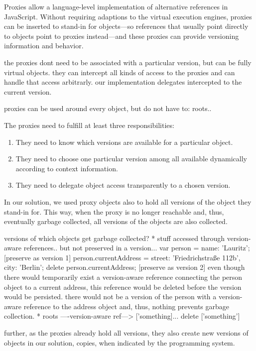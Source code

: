 Proxies allow a language-level implementation of alternative references in JavaScript.
Without requiring adaptions to the virtual execution engines, proxies can be inserted to stand-in for objects---so references that usually point directly to objects point to proxies instead---and these proxies can provide versioning information and behavior.

the proxies dont need to be associated with a particular version, but can be fully virtual objects.
they can intercept all kinds of access to the proxies and can handle that access arbitrarly.
our implementation delegates intercepted to the current version.

proxies can be used around every object, but do not have to: roots..

The proxies need to fulfill at least three responsibilities:
\begin{enumerate}
    \item They need to know which versions are available for a particular object.
    \item They need to choose one particular version among all available dynamically according to context information.
    \item They need to delegate object access transparently to a chosen version.
\end{enumerate}

In our solution, we used proxy objects also to hold all versions of the object they stand-in for.
This way, when the proxy is no longer reachable and, thus, eventually garbage collected, all versions of the objects are also collected.

versions of which objects get garbage collected?
* stuff accessed through version-aware references.. but not preserved in a version... 
    var person = {name: 'Lauritz'};
    [preserve as version 1]
    person.currentAddress = {street: 'Friedrichstraße 112b',
                     city: 'Berlin'};
    delete person.currentAddress;
    [preserve as version 2]
even though there would temporarily exist a version-aware reference connecting the person object to a current address, this reference would be deleted before the version would be persisted. there would not be a version of the person with a version-aware reference to the address object and, thus, nothing prevents garbage collection.
* roots ----version-aware ref---> ['something]... delete ['something']

further, as the proxies already hold all versions, they also create new versions of objects in our solution, copies, when indicated by the programming system.





